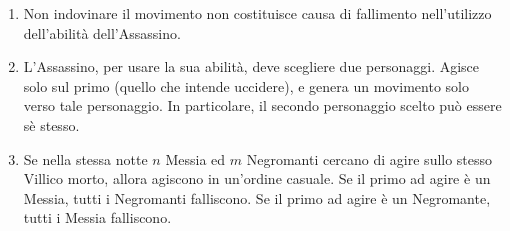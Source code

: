 \documentclass[a4paper,10pt]{article}
\begin{document}
\begin{enumerate}

	\item Non indovinare il movimento non costituisce causa di fallimento nell'utilizzo dell'abilità dell'Assassino.

	\item L'Assassino, per usare la sua abilità, deve scegliere due personaggi. Agisce solo sul primo (quello che intende uccidere), e genera un movimento solo verso tale personaggio. In particolare, il secondo personaggio scelto può essere sè stesso.



	\item Se nella stessa notte $n$ Messia ed $m$ Negromanti cercano di agire sullo stesso Villico morto, allora agiscono in un'ordine casuale. Se il primo ad agire è un Messia, tutti i Negromanti falliscono. Se il primo ad agire è un Negromante, tutti i Messia falliscono.


\end{enumerate}
\end{document}
